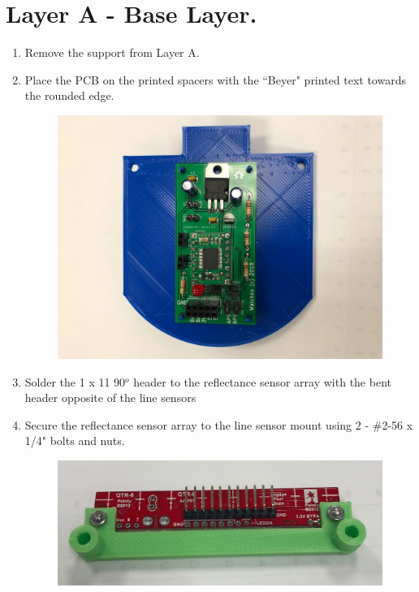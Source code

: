 \documentclass{handout}
\begin{document}
	\section{Layer A - Base Layer.}
	\begin{enumerate}
		\item Remove the support from Layer A.
		\item Place the PCB on the printed spacers with the ``Beyer" printed text towards the rounded edge.
		
		\begin{figure} [H]
			\centering
			\includegraphics[width=.75\textwidth]{1.jpg}
		\end{figure}
	
		\item Solder the 1 x 11 90$^o$ header to the reflectance sensor array with the bent header opposite of the line sensors
		\item Secure the reflectance sensor array to the line sensor mount using 2 - \#2-56 x 1/4" bolts and nuts.
		
		\begin{figure} [H]
			\centering
			\includegraphics[width=.75\textwidth]{2.jpg}
		\end{figure}
	\end{enumerate}
	
\end{document}
